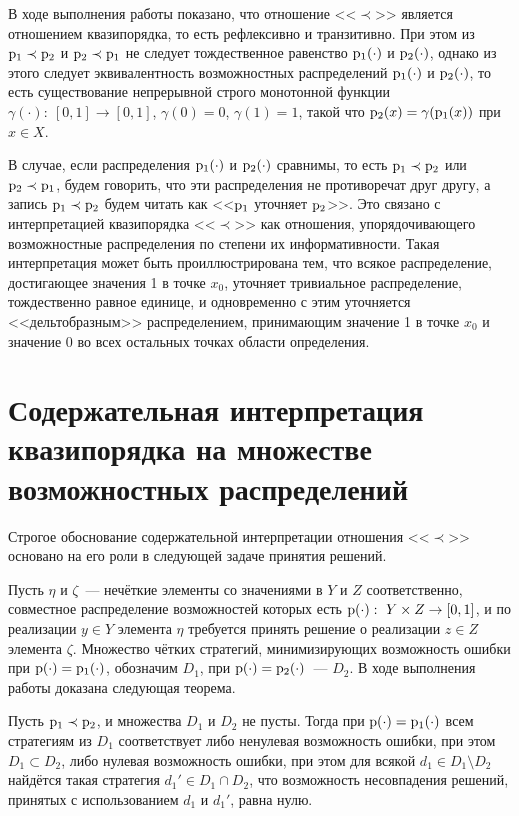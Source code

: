 В ходе выполнения работы показано, что отношение <<$\prec$>> является отношением квазипорядка, то есть рефлексивно и транзитивно. При этом из ${\mathrm{p}}_1\prec{\mathrm{p}}_2$ и ${\mathrm{p}}_2\prec{\mathrm{p}}_1$ не следует тождественное равенство ${\mathrm{p}}_1(\cdot)$ и ${\mathrm{p}}_2(\cdot)$, однако из этого следует эквивалентность возможностных распределений ${\mathrm{p}}_1(\cdot)$ и ${\mathrm{p}}_2(\cdot)$, то есть существование непрерывной строго монотонной функции $\gamma(\cdot):\ [0,1]\to[0,1]$, $\gamma(0) = 0$, $\gamma(1) = 1$, такой что ${\mathrm{p}}_2(x) = \gamma({\mathrm{p}}_1(x))$ при $x\in X$.

В случае, если распределения ${\mathrm{p}}_1(\cdot)$ и ${\mathrm{p}}_2(\cdot)$ сравнимы, то есть ${\mathrm{p}}_1\prec{\mathrm{p}}_2$ или ${\mathrm{p}}_2\prec{\mathrm{p}}_1$, будем говорить, что эти распределения не противоречат друг другу,
а запись ${\mathrm{p}}_1\prec{\mathrm{p}}_2$ будем читать как <<${\mathrm{p}}_1$ уточняет ${\mathrm{p}}_2$>>.
Это связано с интерпретацией квазипорядка <<$\prec$>> как отношения, упорядочивающего возможностные распределения по степени их информативности. Такая интерпретация может быть проиллюстрирована тем, что всякое распределение, достигающее значения 1 в точке $x_0$, уточняет тривиальное распределение, тождественно равное единице, и одновременно с этим уточняется <<дельтобразным>> распределением, принимающим значение 1 в точке $x_0$ и значение 0 во всех остальных точках области определения.

\section{Содержательная интерпретация квазипорядка на множестве возможностных распределений}

Строгое обоснование содержательной интерпретации отношения <<$\prec$>> основано на его роли в следующей задаче принятия решений.

Пусть $\eta$ и $\zeta$~--- нечёткие элементы со значениями в $Y$ и $Z$ соответственно, совместное распределение возможностей которых есть ${\mathrm{p}}(\cdot):\ Y\times Z\to[0,1]$, и по реализации $y\in Y$ элемента $\eta$ требуется принять решение о реализации $z\in Z$ элемента $\zeta$. Множество чётких стратегий, минимизирующих возможность ошибки при ${\mathrm{p}}(\cdot) = {\mathrm{p}}_1(\cdot)$, обозначим $D_1$, при ${\mathrm{p}}(\cdot) = {\mathrm{p}}_2(\cdot)$~--- $D_2$.
В ходе выполнения работы доказана следующая теорема.

\begin{theorem}
\label{theorem_zubyuk}
    Пусть ${\mathrm{p}}_1\prec{\mathrm{p}}_2$, и множества $D_1$ и $D_2$ не пусты. Тогда при ${\mathrm{p}}(\cdot) = {\mathrm{p}}_1(\cdot)$ всем стратегиям из $D_1$ соответствует либо ненулевая возможность ошибки, при этом $D_1\subset D_2$, либо нулевая возможность ошибки, при этом для всякой $d_1\in D_1\setminus D_2$ найдётся такая стратегия $d_1'\in  D_1\cap D_2$, что возможность несовпадения решений, принятых с использованием $d_1$ и $d_1'$, равна нулю.
\end{theorem}

